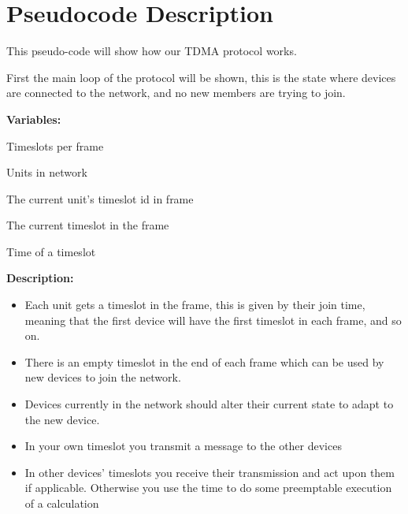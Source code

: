 \section{Pseudocode Description}
This pseudo-code will show how our TDMA protocol works.

First the main loop of the protocol will be shown, this is the state where devices are connected to the network, and no new members are trying to join.
\bigskip

\noindent
\textbf{Variables:} 
\begin{description}[labelindent=\parindent]
    \item[$\alpha$] Timeslots per frame
    \item[$\beta$] Units in network
    \item[$\kappa$] The current unit's timeslot id in frame
    \item[$\lambda$] The current timeslot in the frame
    \item[$\rho$] Time of a timeslot
\end{description}
\bigskip

\noindent
\textbf{Description:}
\begin{itemize}
    \item Each unit gets a timeslot in the frame, this is given by their join time, meaning that the first device will have the first timeslot in each frame, and so on.
    \item There is an empty timeslot in the end of each frame which can be used by new devices to join the network.
    \item Devices currently in the network should alter their current state to adapt to the new device.
    \item In your own timeslot you transmit a message to the other devices
    \item In other devices' timeslots you receive their transmission and act upon them if applicable. Otherwise you use the time to do some preemptable execution of a calculation
\end{itemize}

